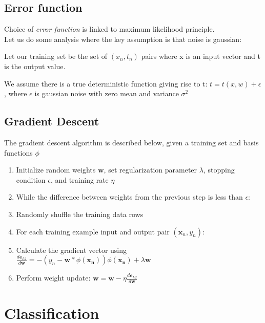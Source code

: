 \documentclass[a4paper]{article}
\begin{document}
	\subsection{Error function}
	Choice of \textit{error function} is linked to maximum likelihood principle. \\
	
	Let us do some analysis where the key assumption is that noise is gaussian:
	
	Let our training set be the set of ${(x_n, t_n)}$ pairs where x is an input
	vector and t is the output value.
	
	We assume there is a true deterministic function giving rise to t:
	$t = t(x, w) + \epsilon$, where $\epsilon$ is gaussian noise with zero mean and
	variance $\sigma^2$
	
	\subsection{Gradient Descent}
	
	The gradient descent algorithm is described below, given a training set and basis functions $\phi$

	\begin{enumerate}
	
	\item Initialize random weights $\pmb{w}$, set regularization parameter $\lambda$, stopping condition $\epsilon$, and training rate $\eta$
	\item While the difference between weights from the previous step is less than $\epsilon$:
	
	\setlength{\itemindent}{2em}
	\item Randomly shuffle the training data rows
	\item For each training example input and output pair $(\pmb{x}_n, y_n)$:
	
	\setlength{\itemindent}{4em}
	\item Calculate the gradient vector using \newline  
	$\frac{d\pmb{e}_{L2}}{d\pmb{w}} = -(y_n - \pmb{w} * \phi(\pmb{x_n}))\phi(\pmb{x_n}) + \lambda\pmb{w}$
	
	\item Perform weight update: $\pmb{w} = \pmb{w} - \eta \frac{d\pmb{e}_{L2}}{d\pmb{w}}$
	
	\end{enumerate}
	
	\clearpage
	\section{Classification}
	
\end{document}
